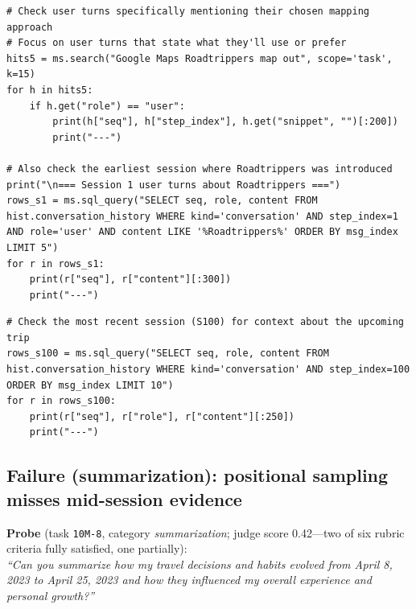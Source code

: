 \begin{lstlisting}[style=scroll, caption={User-turn search plus session-scoped SQL over Session 1.}, label={lst:pf-c4}]
# Check user turns specifically mentioning their chosen mapping approach
# Focus on user turns that state what they'll use or prefer
hits5 = ms.search("Google Maps Roadtrippers map out", scope='task', k=15)
for h in hits5:
    if h.get("role") == "user":
        print(h["seq"], h["step_index"], h.get("snippet", "")[:200])
        print("---")

# Also check the earliest session where Roadtrippers was introduced
print("\n=== Session 1 user turns about Roadtrippers ===")
rows_s1 = ms.sql_query("SELECT seq, role, content FROM hist.conversation_history WHERE kind='conversation' AND step_index=1 AND role='user' AND content LIKE '%Roadtrippers%' ORDER BY msg_index LIMIT 5")
for r in rows_s1:
    print(r["seq"], r["content"][:300])
    print("---")
\end{lstlisting}

\begin{lstlisting}[style=scroll, caption={Reading the opening of Session 100 to scope the upcoming trip.}, label={lst:pf-c5}]
# Check the most recent session (S100) for context about the upcoming trip
rows_s100 = ms.sql_query("SELECT seq, role, content FROM hist.conversation_history WHERE kind='conversation' AND step_index=100 ORDER BY msg_index LIMIT 10")
for r in rows_s100:
    print(r["seq"], r["role"], r["content"][:250])
    print("---")
\end{lstlisting}

\subsection{Failure (summarization): positional sampling misses mid-session evidence}
\label{app:traj-sum}

\begin{tcolorbox}[colback=codebg, colframe=codeframe, boxrule=0.6pt, left=6pt, right=6pt, top=5pt, bottom=5pt]
\textbf{Probe} (task \texttt{10M-8}, category \emph{summarization}; judge
score 0.42---two of six rubric criteria fully satisfied, one partially):\\[3pt]
\emph{``Can you summarize how my travel decisions and habits evolved from
April 8, 2023 to April 25, 2023 and how they influenced my overall experience
and personal growth?''}
\end{tcolorbox}

